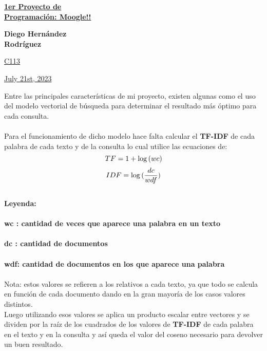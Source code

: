 \documentclass{article}
\begin{document}
	
\begin{center}
	
	\underline{\textbf{\Huge 1er Proyecto de}}\\
	\vspace{0.5cm}	
	\underline{\textbf{\Huge Programación: Moogle!!}}\\
	
	\vspace{3.3cm}
	
	\textbf{\Huge Diego Hernández}\\
	\vspace{0.5cm}	
	\textbf{\Huge Rodríguez}\\
	
	\vspace{2.3cm}
	
	\underline{\Huge C113}\\
	
	\vspace{3.3cm}
	
	\underline{\Huge July 21st, 2023}\\
	
\end{center}

\newpage

\Large Entre las principales características de mi proyecto, existen algunas como el uso del modelo vectorial de búsqueda para determinar el resultado más óptimo para cada consulta.\\
\\
\Large Para el funcionamiento de dicho modelo hace falta calcular el \textbf{TF-IDF} de cada palabra de cada texto y de la consulta lo cual utilice las ecuaciones de:\\
\begin{equation}
\Large TF = 1 + \log{(wc)}
\end{equation}
\begin{equation}
\Large IDF = \log{(\frac{dc}{wdf})}
\end{equation}
\\
\textbf{\large Leyenda: \\
	\\
	\large wc : cantidad de veces que aparece una palabra en un texto\\
	\\
	\large dc : cantidad de documentos\\
	\\
	\large wdf: cantidad de documentos en los que aparece una palabra\\}
\\
\Large Nota: estos valores se refieren a los relativos a cada texto, ya que todo se calcula en función de cada documento dando en la gran mayoría de los casos valores distintos.
\\
\Large Luego utilizando esos valores se aplica un producto escalar entre vectores y se dividen por la raíz de los cuadrados de los valores de \textbf{TF-IDF} de cada palabra en el texto y en la consulta y así queda el valor del coseno necesario para devolver un buen resultado.



	
\end{document}
